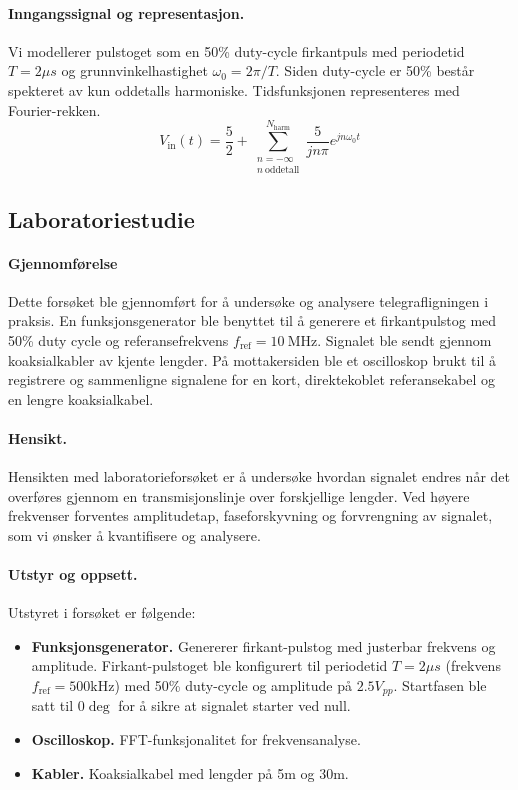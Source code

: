 \paragraph{Inngangssignal og representasjon.}
Vi modellerer pulstoget som en 50\% duty-cycle firkantpuls med periodetid $T = 2 \mu s$ og grunnvinkelhastighet $\omega_0 = 2\pi / T$. Siden duty-cycle er 50\% består spekteret av kun oddetalls harmoniske. Tidsfunksjonen representeres med Fourier-rekken.
\begin{equation}
    V_{\mathrm{in}}(t) = \frac{5}{2} + \sum_{\substack{n=-\infty\\ n\ \text{oddetall}}}^{N_{\mathrm{harm}}}\frac{5}{jn\pi} e^{jn\omega_0 t}
\end{equation} 


\clearpage
\subsection{Laboratoriestudie}
\paragraph{Gjennomførelse}
Dette forsøket ble gjennomført for å undersøke og analysere telegrafligningen i praksis. En funksjonsgenerator ble benyttet til å generere et firkantpulstog med 50\% duty cycle og referansefrekvens $f_\mathrm{ref} = 10~\mathrm{MHz}$. Signalet ble sendt gjennom koaksialkabler av kjente lengder. På mottakersiden ble et oscilloskop brukt til å registrere og sammenligne signalene for en kort, direktekoblet referansekabel og en lengre koaksialkabel.

\paragraph{Hensikt.} Hensikten med laboratorieforsøket er å undersøke hvordan signalet endres når det overføres gjennom en transmisjonslinje over forskjellige lengder. Ved høyere frekvenser forventes amplitudetap, faseforskyvning og forvrengning av signalet, som vi ønsker å kvantifisere og analysere.

\paragraph{Utstyr og oppsett.}
Utstyret i forsøket er følgende:
\begin{itemize}
    \item \textbf{Funksjonsgenerator.} Genererer firkant-pulstog med justerbar frekvens og amplitude. Firkant-pulstoget ble konfigurert til periodetid $T = 2 \mu s$ (frekvens $f_\mathrm{ref} = 500 \mathrm{kHz}$) med 50\% duty-cycle og amplitude på $2.5V_{pp}$. Startfasen ble satt til $0\deg$ for å sikre at signalet starter ved null.
    \item \textbf{Oscilloskop.} FFT-funksjonalitet for frekvensanalyse.
    \item \textbf{Kabler.} Koaksialkabel med lengder på 5m og 30m.
\end{itemize}

